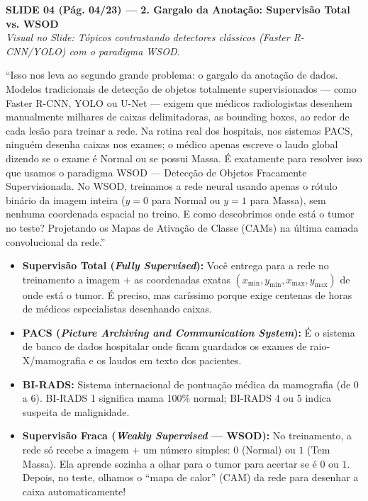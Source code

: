 \documentclass[11pt,a4paper]{article}
\newcommand{\slideheader}[3]{%
    \vspace{10pt}%
    \begin{tcolorbox}[colback=slateborder, colframe=slateborder, coltext=white, boxrule=0pt, arc=3pt, left=8pt, right=8pt, top=5pt, bottom=5pt]
        {\large\bfseries #1 — #2}\\[2pt]
        {\small\itshape Visual no Slide: #3}
    \end{tcolorbox}%
}
\newenvironment{falabox}{%
    \begin{tcolorbox}[colback=speechbg, colframe=speechborder, boxrule=1.2pt, arc=4pt, left=10pt, right=10pt, top=8pt, bottom=8pt, title={\bfseries O QUE VOCÊ DEVE FALAR (Fala Sugerida)}]%
}{%
    \end{tcolorbox}%
}
\newenvironment{explicabox}{%
    \begin{tcolorbox}[colback=explainbg, colframe=explainborder, boxrule=0.8pt, arc=4pt, left=10pt, right=10pt, top=8pt, bottom=8pt, title={\bfseries ENTENDA O QUE VOCÊ ESTÁ FALANDO (Explicação Didática de Cada Termo)}]%
}{%
    \end{tcolorbox}%
}
\begin{document}
\newpage
\slideheader{SLIDE 04 (Pág. 04/23)}{2. Gargalo da Anotação: Supervisão Total vs. WSOD}{Tópicos contrastando detectores clássicos (Faster R-CNN/YOLO) com o paradigma WSOD.}

\begin{falabox}
``Isso nos leva ao segundo grande problema: o gargalo da anotação de dados. Modelos tradicionais de detecção de objetos totalmente supervisionados — como Faster R-CNN, YOLO ou U-Net — exigem que médicos radiologistas desenhem manualmente milhares de caixas delimitadoras, as bounding boxes, ao redor de cada lesão para treinar a rede. Na rotina real dos hospitais, nos sistemas PACS, ninguém desenha caixas nos exames; o médico apenas escreve o laudo global dizendo se o exame é Normal ou se possui Massa. É exatamente para resolver isso que usamos o paradigma WSOD — Detecção de Objetos Fracamente Supervisionada. No WSOD, treinamos a rede neural usando apenas o rótulo binário da imagem inteira ($y = 0$ para Normal ou $y = 1$ para Massa), sem nenhuma coordenada espacial no treino. E como descobrimos onde está o tumor no teste? Projetando os Mapas de Ativação de Classe (CAMs) na última camada convolucional da rede.''
\end{falabox}

\begin{explicabox}
\begin{itemize}[leftmargin=*, itemsep=4pt]
    \item \textbf{Supervisão Total (\textit{Fully Supervised}):} Você entrega para a rede no treinamento a imagem $+$ as coordenadas exatas $(x_{\min}, y_{\min}, x_{\max}, y_{\max})$ de onde está o tumor. É preciso, mas caríssimo porque exige centenas de horas de médicos especialistas desenhando caixas.
    \item \textbf{PACS (\textit{Picture Archiving and Communication System}):} É o sistema de banco de dados hospitalar onde ficam guardados os exames de raio-X/mamografia e os laudos em texto dos pacientes.
    \item \textbf{BI-RADS:} Sistema internacional de pontuação médica da mamografia (de 0 a 6). BI-RADS 1 significa mama 100\% normal; BI-RADS 4 ou 5 indica suspeita de malignidade.
    \item \textbf{Supervisão Fraca (\textit{Weakly Supervised} — WSOD):} No treinamento, a rede só recebe a imagem $+$ um número simples: $0$ (Normal) ou $1$ (Tem Massa). Ela aprende sozinha a olhar para o tumor para acertar se é $0$ ou $1$. Depois, no teste, olhamos o ``mapa de calor'' (CAM) da rede para desenhar a caixa automaticamente!
\end{itemize}
\end{explicabox}
\end{document}
